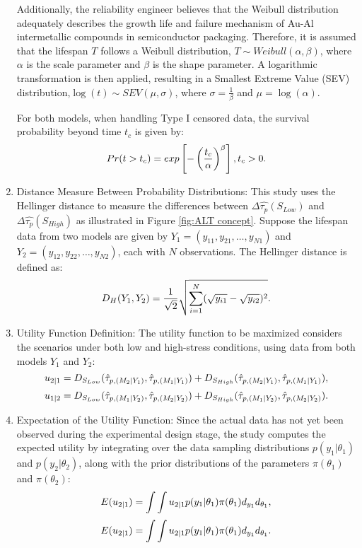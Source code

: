 \begin{enumerate}
Additionally, the reliability engineer believes that the Weibull distribution adequately describes the growth life and failure mechanism of Au-Al intermetallic compounds in semiconductor packaging. Therefore, it is assumed that the lifespan $T$ follows a Weibull distribution, $T\sim Weibull(\alpha,\beta)$, where $\alpha$ is the scale parameter and $\beta$ is the shape parameter. A logarithmic transformation is then applied, resulting in a Smallest Extreme Value (SEV) distribution,$\log(t)\sim SEV(\mu,\sigma)$, where $\sigma=\frac{1}{\beta}$ and $\mu=\log(\alpha)$.

For both models, when handling Type I censored data, the survival probability beyond time $t_c$ is given by:
\begin{equation} \notag
Pr(t>t_c)=exp\left[-\left(\frac{t_c}{\alpha}\right)^\beta\right],t_c>0. 
\end{equation}

\item Distance Measure Between Probability Distributions: This study uses the Hellinger distance to measure the differences between $\Delta\hat{\tau_p}(S_{Low})$ and $\Delta\hat{\tau_p}(S_{High})$ as illustrated in Figure \ref{fig:ALT concept}. Suppose the lifespan data from two models are given by $Y_1=(y_{11}, y_{21}, \dots, y_{N1})$ and $Y_2=(y_{12}, y_{22}, \dots, y_{N2})$, each with $N$ observations. The Hellinger distance is defined as:
\begin{equation} \notag
D_H(Y_1,Y_2)=\frac{1}{\sqrt{2}}\sqrt{\sum_{i=1}^N(\sqrt{y_{i1}}-\sqrt{y_{i2}})^2}.
\end{equation}

\item Utility Function Definition: The utility function to be maximized considers the scenarios under both low and high-stress conditions, using data from both models $Y_1$ and $Y_2$:
\begin{equation} \notag
u_{2|1}=D_{S_{Low}}(\hat{\tau}_{p,(M_2|Y_1)},\hat{\tau}_{p,(M_1|Y_1)}) +D_{S_{High}}(\hat{\tau}_{p,(M_2|Y_1)},\hat{\tau}_{p,(M_1|Y_1)}),
\end{equation}
\begin{equation} \notag
u_{1|2}=D_{S_{Low}}(\hat{\tau}_{p,(M_1|Y_2)},\hat{\tau}_{p,(M_2|Y_2)}) +D_{S_{High}}(\hat{\tau}_{p,(M_1|Y_2)},\hat{\tau}_{p,(M_2|Y_2)}).
\end{equation}

\item Expectation of the Utility Function: Since the actual data has not yet been observed during the experimental design stage, the study computes the expected utility by integrating over the data sampling distributions $p(y_1|\theta_1)$ and $p(y_2|\theta_2)$, along with the prior distributions of the parameters $\pi(\theta_1)$ and $\pi(\theta_2)$:
\begin{equation} \notag
E(u_{2|1})=\int\int u_{2|1}p(y_1|\theta_1)\pi(\theta_1)d_{y_1}d_{\theta_1},
\end{equation}
\begin{equation} \notag
E(u_{2|1})=\int\int u_{2|1}p(y_1|\theta_1)\pi(\theta_1)d_{y_1}d_{\theta_1}.
\end{equation}


\end{enumerate}
